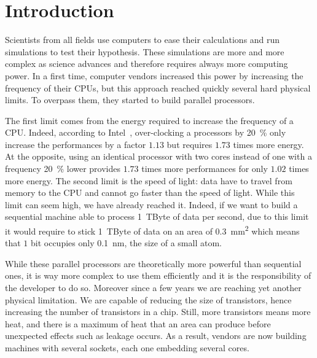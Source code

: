\chapter{Introduction}

Scientists from all fields use computers to ease their calculations and run simulations to test their hypothesis.
These simulations are more and more complex as science advances and therefore requires always more computing power.
In a first time, computer vendors increased this power by increasing the frequency of their \glspl{CPU}, but this approach reached quickly several hard physical limits.
To overpass them, they started to build parallel processors.

The first limit comes from the energy required to increase the frequency of a \gls{CPU}.
Indeed, according to \gls{Intel}~\cite{Ganesan16Introduction}, over-clocking a processors by \SI{20}{\%} only increase the performances by a factor $1.13$ but requires $1.73$ times more energy.
At the opposite, using an identical processor with two cores instead of one with a frequency \SI{20}{\%} lower provides $1.73$ times more performances for only $1.02$ times more energy.
The second limit is the speed of light: data have to travel from memory to the \gls{CPU} and cannot go faster than the speed of light.
While this limit can seem high, we have already reached it.
Indeed, if we want to build a sequential machine able to process \SI{1}{TByte} of data per second, due to this limit it would require  to stick \SI{1}{TByte} of data on an area of \SI{0.3}{mm^2} which means that $1$ bit occupies only \SI{0.1}{nm}, the size of a small atom.

While these parallel processors are theoretically more powerful than sequential ones, it is way more complex to use them efficiently and it is the responsibility of the developer to do so.
Moreover since a few years we are reaching yet another physical limitation.
We are capable of reducing the size of transistors, hence increasing the number of transistors in a chip.
Still, more transistors means more heat, and there is a maximum of heat that an area can produce before unexpected effects such as leakage occurs.
As a result, vendors are now building machines with several sockets, each one embedding several cores.

